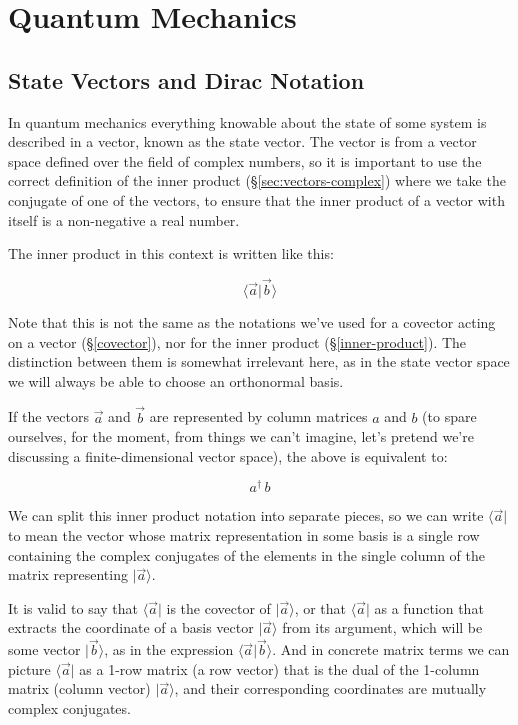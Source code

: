 \chapter{Quantum Mechanics} \label{ch:qm}

\section{State Vectors and Dirac Notation}

In quantum mechanics everything knowable about the state of some system is described in a vector, known as the state vector. The vector is from a vector space defined over the field of complex numbers, so it is important to use the correct definition of the inner product (§\ref{sec:vectors-complex}) where we take the conjugate of one of the vectors, to ensure that the inner product of a vector with itself is a non-negative a real number.

The inner product in this context is written like this:

$$\langle \vec{a}|\vec{b} \rangle$$

Note that this is not the same as the notations we've used for a covector acting on a vector (§\ref{covector}), nor for the inner product (§\ref{inner-product}). The distinction between them is somewhat irrelevant here, as in the state vector space we will always be able to choose an orthonormal basis.

If the vectors $\vec{a}$ and $\vec{b}$ are represented by column matrices $a$ and $b$ (to spare ourselves, for the moment, from things we can't imagine, let's pretend we're discussing a finite-dimensional vector space), the above is equivalent to:

$$a^{\dagger} \, b$$

We can split this inner product notation into separate pieces, so we can write $\langle \vec{a}|$ to mean the vector whose matrix representation in some basis is a single row containing the complex conjugates of the elements in the single column of the matrix representing $|\vec{a} \rangle$.

It is valid to say that $\langle \vec{a}|$ is the covector of $|\vec{a} \rangle$, or that $\langle \vec{a}|$ as a function that extracts the coordinate of a basis vector $|\vec{a} \rangle$ from its argument, which will be some vector $|\vec{b} \rangle$, as in the expression $\langle \vec{a}|\vec{b} \rangle$. And in concrete matrix terms we can picture $\langle \vec{a}|$ as a 1-row matrix (a row vector) that is the dual of the 1-column matrix (column vector) $|\vec{a} \rangle$, and their corresponding coordinates are mutually complex conjugates.

